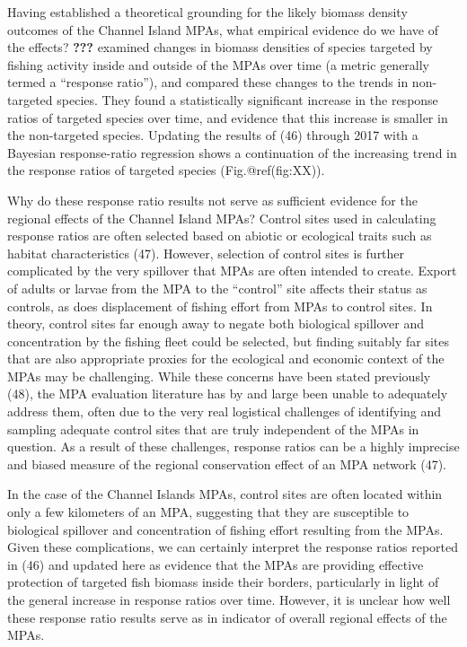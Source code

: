 \documentclass[9pt,twocolumn,twoside,lineno]{pnas-new}
\begin{document}
Having established a theoretical grounding for the likely biomass
density outcomes of the Channel Island MPAs, what empirical evidence do
we have of the effects? \textbf{???} examined changes in biomass
densities of species targeted by fishing activity inside and outside of
the MPAs over time (a metric generally termed a ``response ratio''), and
compared these changes to the trends in non-targeted species. They found
a statistically significant increase in the response ratios of targeted
species over time, and evidence that this increase is smaller in the
non-targeted species. Updating the results of (46) through 2017 with a
Bayesian response-ratio regression shows a continuation of the
increasing trend in the response ratios of targeted species
(Fig.@ref(fig:XX)).

Why do these response ratio results not serve as sufficient evidence for
the regional effects of the Channel Island MPAs? Control sites used in
calculating response ratios are often selected based on abiotic or
ecological traits such as habitat characteristics (47). However,
selection of control sites is further complicated by the very spillover
that MPAs are often intended to create. Export of adults or larvae from
the MPA to the ``control'' site affects their status as controls, as
does displacement of fishing effort from MPAs to control sites. In
theory, control sites far enough away to negate both biological
spillover and concentration by the fishing fleet could be selected, but
finding suitably far sites that are also appropriate proxies for the
ecological and economic context of the MPAs may be challenging. While
these concerns have been stated previously (48), the MPA evaluation
literature has by and large been unable to adequately address them,
often due to the very real logistical challenges of identifying and
sampling adequate control sites that are truly independent of the MPAs
in question. As a result of these challenges, response ratios can be a
highly imprecise and biased measure of the regional conservation effect
of an MPA network (47).

In the case of the Channel Islands MPAs, control sites are often located
within only a few kilometers of an MPA, suggesting that they are
susceptible to biological spillover and concentration of fishing effort
resulting from the MPAs. Given these complications, we can certainly
interpret the response ratios reported in (46) and updated here as
evidence that the MPAs are providing effective protection of targeted
fish biomass inside their borders, particularly in light of the general
increase in response ratios over time. However, it is unclear how well
these response ratio results serve as in indicator of overall regional
effects of the MPAs.
\end{document}
